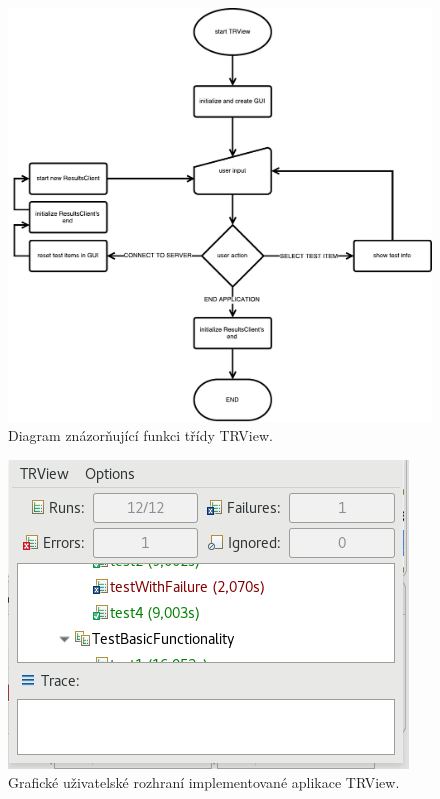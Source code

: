       \begin{figure}
	\includegraphics[width=\textwidth, height=\textheight, keepaspectratio, center]{obrazky-figures/trview_trview_flowchart.pdf}
	\caption{Diagram znázorňující funkci třídy TRView.}
	\label{fig:trview_flowchart}
      \end{figure}

      \begin{figure}
	\includegraphics[width=\textwidth, center]{obrazky-figures/TRV_gui.png}
	\caption{Grafické uživatelské rozhraní implementované aplikace TRView.}
	\label{fig:TRV_gui}
      \end{figure}

